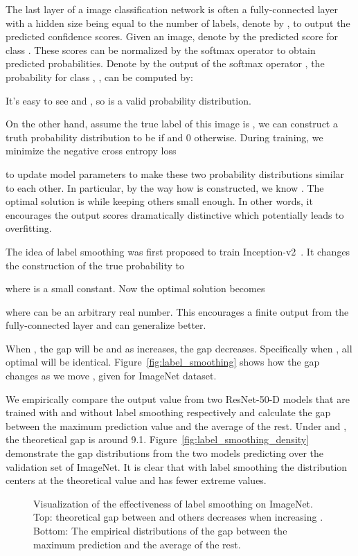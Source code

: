 \documentclass[10pt,twocolumn,letterpaper]{article}
\begin{document}
The last layer of a image classification network is often a fully-connected
layer with a hidden size being equal to the number of labels, denote by , to
output the predicted confidence scores. Given an image, denote by  the
predicted score for class . These scores can be normalized by the softmax
operator to obtain predicted probabilities. Denote by  the output of the
softmax operator , the probability for
class , , can be computed by:

It's easy to see  and , so  is a valid
probability distribution.

On the other hand, assume the true label of this image is , we can
construct a truth probability distribution to be  if  and 0 otherwise. During
training, we minimize the negative cross entropy loss


to update model parameters to make these two
probability distributions similar to each other. In particular, by the way how  is
constructed, we know . The optimal solution is  while
keeping others small enough. In other words, it encourages the output scores
dramatically distinctive which potentially leads to overfitting.

The idea of label smoothing was first proposed to train
Inception-v2~\cite{DBLP:journals/corr/SzegedyVISW15}. It changes the
construction of the true probability to


where  is a small constant. Now the optimal solution becomes



where  can be an arbitrary real number. This encourages a finite output from the 
fully-connected layer and can generalize better.

When , the gap  will be  and 
as  increases, the gap decreases. Specifically when , 
all optimal  will be identical. Figure~\ref{fig:label_smoothing} shows how the gap
changes as we move , given  for ImageNet dataset.

We empirically compare the output value from two ResNet-50-D models that are trained with and without 
label smoothing respectively and calculate the gap between the maximum prediction value and 
the average of the rest. Under  and , the theoretical gap is 
around 9.1. Figure~\ref{fig:label_smoothing_density} demonstrate the gap distributions from the two models predicting
over the validation set of ImageNet. It is clear that with label smoothing the distribution centers
at the theoretical value and has fewer extreme values.

\begin{figure}[t!]
  \centering
  \vfill {}\caption{Visualization of the effectiveness of label smoothing on ImageNet. Top: theoretical gap between  and others decreases when increasing
    . Bottom: The empirical distributions of the gap between the maximum prediction and the average of the rest.}
  \label{fig:learning-rate-curve}
\end{figure}
\end{document}
